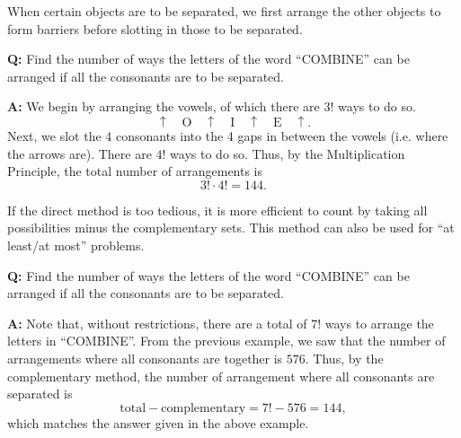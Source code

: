 \begin{recipe}
    When certain objects are to be separated, we first arrange the other objects to form barriers before slotting in those to be separated.
\end{recipe}

\begin{example}
    \phantom{.}

    \textbf{Q:} Find the number of ways the letters of the word ``COMBINE'' can be arranged if all the consonants are to be separated.

    \textbf{A:} We begin by arranging the vowels, of which there are $3!$ ways to do so. \[\uparrow \quad \boxed{\text{O}} \quad \uparrow \quad \boxed{\text{I}} \quad \uparrow \quad \boxed{\text{E}} \quad \uparrow.\] Next, we slot the 4 consonants into the 4 gaps in between the vowels (i.e. where the arrows are). There are $4!$ ways to do so. Thus, by the Multiplication Principle, the total number of arrangements is \[3! \cdot 4! = 144.\]
\end{example}

\begin{recipe}
    If the direct method is too tedious, it is more efficient to count by taking all possibilities minus the complementary sets. This method can also be used for ``at least/at most'' problems.
\end{recipe}

\begin{example}
    \phantom{.}
    
    \textbf{Q:} Find the number of ways the letters of the word ``COMBINE'' can be arranged if all the consonants are to be separated.

    \textbf{A:} Note that, without restrictions, there are a total of $7!$ ways to arrange the letters in ``COMBINE''. From the previous example, we saw that the number of arrangements where all consonants are together is $576$. Thus, by the complementary method, the number of arrangement where all consonants are separated is \[\text{total} - \text{complementary} = 7! - 576 = 144,\] which matches the answer given in the above example.
\end{example}
